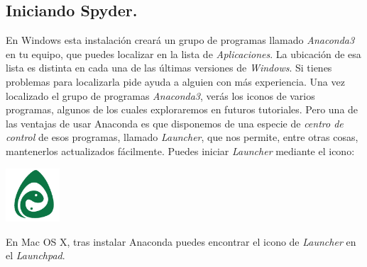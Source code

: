\documentclass[10pt,a4paper]{article}\usepackage[]{graphicx}\usepackage[]{color}
\newcounter {cont01}
\begin{document}

\newpage

\subsection{Iniciando Spyder.}
\label{tut02py:subsec:iniciandoConsolaJupyter}

En Windows esta instalación creará un grupo de programas llamado {\em Anaconda3} en tu equipo, que puedes localizar en la lista de {\em Aplicaciones}. La ubicación de esa lista es distinta en cada una de las últimas versiones de {\em Windows}. Si tienes problemas para localizarla pide ayuda a alguien con más experiencia. Una vez localizado el grupo de programas {\em Anaconda3}, verás los iconos de varios programas, algunos de los cuales  exploraremos en futuros tutoriales. Pero una de las ventajas de usar Anaconda es que disponemos de una especie de {\em centro de control} de esos programas, llamado {\em Launcher}, que nos permite, entre otras cosas, mantenerlos actualizados fácilmente. Puedes iniciar {\em Launcher} mediante el icono:
\begin{center}
\includegraphics[width=2cm]{../fig/Tut-00-py-15-AnacondaIcon.png}\\[1cm]
\end{center}
En Mac OS X, tras instalar Anaconda puedes encontrar el icono de {\em Launcher} en el {\em Launchpad}. 
\end{document}
